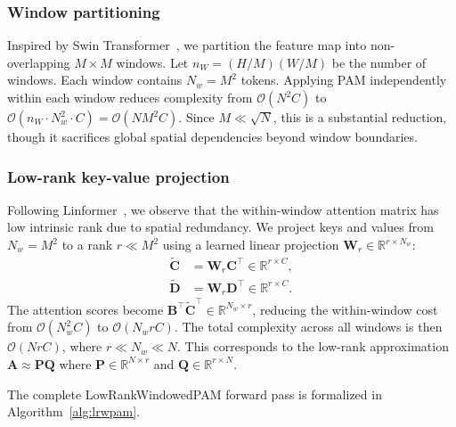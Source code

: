 \documentclass[conference]{IEEEtran}
\begin{document}
\subsubsection{Window partitioning}
Inspired by Swin Transformer~\cite{liu2021swin}, we partition the feature map into non-overlapping $M \times M$ windows. Let $n_W = (H/M)(W/M)$ be the number of windows. Each window contains $N_w = M^2$ tokens. Applying PAM independently within each window reduces complexity from $\mathcal{O}(N^2 C)$ to $\mathcal{O}(n_W \cdot N_w^2 \cdot C) = \mathcal{O}(N M^2 C)$. Since $M \ll \sqrt{N}$, this is a substantial reduction, though it sacrifices global spatial dependencies beyond window boundaries.

\subsubsection{Low-rank key-value projection}
Following Linformer~\cite{wang2020linformer}, we observe that the within-window attention matrix has low intrinsic rank due to spatial redundancy. We project keys and values from $N_w = M^2$ to a rank $r \ll M^2$ using a learned linear projection $\mathbf{W}_r \in \mathbb{R}^{r \times N_w}$:
\begin{align}
  \tilde{\mathbf{C}} &= \mathbf{W}_r \mathbf{C}^\top \in \mathbb{R}^{r \times C}, \label{eq:low_rank_key}\\
  \tilde{\mathbf{D}} &= \mathbf{W}_r \mathbf{D}^\top \in \mathbb{R}^{r \times C}. \label{eq:low_rank_val}
\end{align}
The attention scores become $\mathbf{B}^\top \tilde{\mathbf{C}}^\top \in \mathbb{R}^{N_w \times r}$, reducing the within-window cost from $\mathcal{O}(N_w^2 C)$ to $\mathcal{O}(N_w r C)$. The total complexity across all windows is then $\mathcal{O}(N r C)$, where $r \ll N_w \ll N$. This corresponds to the low-rank approximation $\mathbf{A} \approx \mathbf{P}\mathbf{Q}$ where $\mathbf{P} \in \mathbb{R}^{N \times r}$ and $\mathbf{Q} \in \mathbb{R}^{r \times N}$.

The complete LowRankWindowedPAM forward pass is formalized in Algorithm~\ref{alg:lrwpam}.
\end{document}
